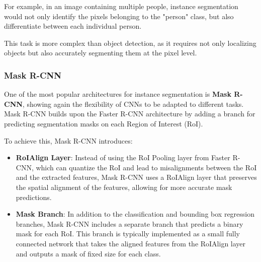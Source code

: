 For example, in an image containing multiple people, instance segmentation would not only identify the pixels belonging to the "person" class, 
but also differentiate between each individual person.

This task is more complex than object detection, as it requires not only localizing objects but also accurately segmenting them at the pixel level.

\subsubsection*{Mask R-CNN}
One of the most popular architectures for instance segmentation is \textbf{Mask R-CNN}, showing again the flexibility of CNNs to be adapted to different tasks.
Mask R-CNN builds upon the Faster R-CNN architecture by adding a branch for predicting segmentation masks on each Region of Interest (RoI).

To achieve this, Mask R-CNN introduces:
\begin{itemize}
    \item \textbf{RoIAlign Layer}: Instead of using the RoI Pooling layer from Faster R-CNN,
    which can quantize the RoI and lead to misalignments between the RoI and the extracted features,
    Mask R-CNN uses a RoIAlign layer that preserves the spatial alignment of the features, allowing for more accurate mask predictions.
    
    \item \textbf{Mask Branch}: In addition to the classification and bounding box regression branches, Mask R-CNN includes a separate branch that predicts a binary mask for each RoI. 
    This branch is typically implemented as a small fully connected network that takes the aligned features from the RoIAlign layer and outputs a mask of fixed size for each class.
\end{itemize}